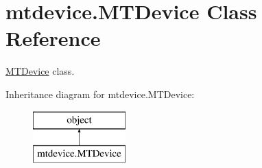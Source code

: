 \hypertarget{classmtdevice_1_1MTDevice}{}\section{mtdevice.\+M\+T\+Device Class Reference}
\label{classmtdevice_1_1MTDevice}


\hyperlink{classmtdevice_1_1MTDevice}{M\+T\+Device} class.  


Inheritance diagram for mtdevice.\+M\+T\+Device\+:\begin{figure}[H]
\begin{center}
\leavevmode
\includegraphics[height=2.000000cm]{classmtdevice_1_1MTDevice}
\end{center}
\end{figure}
